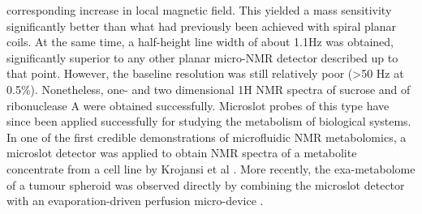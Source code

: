 corresponding increase in local magnetic field. This yielded a mass
sensitivity significantly better than what had previously been achieved
with spiral planar coils. At the same time, a half-height line width of
about 1.1Hz was obtained, significantly superior to any other planar
micro-NMR detector described up to that point. However, the baseline
resolution was still relatively poor (\textgreater{}50 Hz at 0.5\%).
Nonetheless, one- and two dimensional 1H NMR spectra of sucrose and of
ribonuclease A were obtained successfully. Microslot probes of this type
have since been applied successfully for studying the metabolism of
biological systems. In one of the first credible demonstrations of
microfluidic NMR metabolomics, a microslot detector was applied to
obtain NMR spectra of a metabolite concentrate from a cell line by
Krojansi et al \cite{Krojanski:2008ut}. More recently, the exa-metabolome
of a tumour spheroid was observed directly by combining the microslot
detector with an evaporation-driven perfusion micro-device
\cite{Kalfe:2015ik}. 

